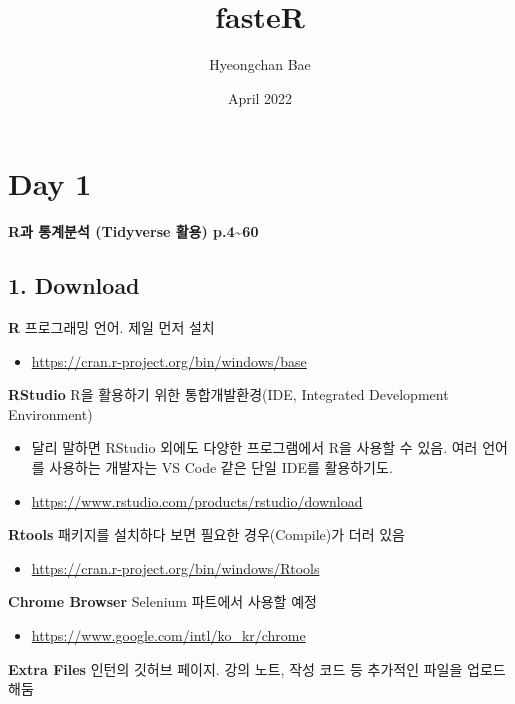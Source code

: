 \documentclass[
  12,
]{article}
\title{fasteR}
\author{Hyeongchan Bae}
\date{April 2022}
\providecommand{\tightlist}{%
  \setlength{\itemsep}{0pt}\setlength{\parskip}{0pt}}
\begin{document}
\maketitle

{
\setcounter{tocdepth}{2}
\tableofcontents
}
\hypertarget{day-1}{%
\section{Day 1}\label{day-1}}

\textbf{R과 통계분석 (Tidyverse 활용) p.4\textasciitilde60}

\hypertarget{download}{%
\subsection{1. Download}\label{download}}

\textbf{R} 프로그래밍 언어. 제일 먼저 설치

\begin{itemize}
\tightlist
\item
  \url{https://cran.r-project.org/bin/windows/base}
\end{itemize}

\textbf{RStudio} R을 활용하기 위한 통합개발환경(IDE, Integrated
Development Environment)

\begin{itemize}
\item
  달리 말하면 RStudio 외에도 다양한 프로그램에서 R을 사용할 수 있음.
  여러 언어를 사용하는 개발자는 VS Code 같은 단일 IDE를 활용하기도.
\item
  \url{https://www.rstudio.com/products/rstudio/download}
\end{itemize}

\textbf{Rtools} 패키지를 설치하다 보면 필요한 경우(Compile)가 더러 있음

\begin{itemize}
\tightlist
\item
  \url{https://cran.r-project.org/bin/windows/Rtools}
\end{itemize}

\textbf{Chrome Browser} Selenium 파트에서 사용할 예정

\begin{itemize}
\tightlist
\item
  \url{https://www.google.com/intl/ko_kr/chrome}
\end{itemize}

\textbf{Extra Files} 인턴의 깃허브 페이지. 강의 노트, 작성 코드 등
추가적인 파일을 업로드 해둠
\end{document}
